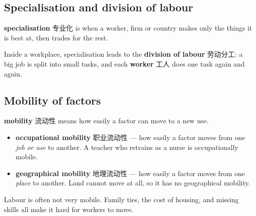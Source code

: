 \documentclass[11pt]{article}
\begin{document}
\subsection*{Specialisation and division of labour}

\textbf{specialisation} 专业化 is when a worker, firm or country makes only the things it is best at, then trades for the rest.

Inside a workplace, specialisation leads to the \textbf{division of labour} 劳动分工: a big job is split into small tasks, and each \textbf{worker} 工人 does one task again and again.

\begin{center}
\end{center}

\subsection*{Mobility of factors}

\textbf{mobility} 流动性 means how easily a factor can move to a new use.

\begin{itemize}
\item \textbf{occupational mobility} 职业流动性 — how easily a factor moves from one \emph{job or use} to another. A teacher who retrains as a nurse is occupationally mobile.

\item \textbf{geographical mobility} 地理流动性 — how easily a factor moves from one \emph{place} to another. Land cannot move at all, so it has no geographical mobility.

\end{itemize}

Labour is often not very mobile. Family ties, the cost of housing, and missing skills all make it hard for workers to move.
\end{document}
